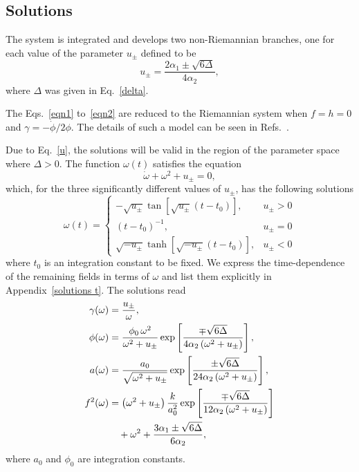 \documentclass[aps,prd,12pt,superscriptaddress,showpacs,showkeys,longbibliography,reprint,nofootinbib]{revtex4-1}
\begin{document}
\subsection{Solutions}

The system is integrated and develops two non-Riemannian branches, one for each value of the parameter $u_\pm$ defined to be
\begin{equation}
  \label{u}
  u_\pm=\frac{2\alpha_1\pm\sqrt{6\Delta}}{4\alpha_2},
\end{equation}
where $\Delta$ was given in Eq.~\eqref{delta}.

The Eqs.~\eqref{eqn1} to~\eqref{eqn2} are reduced to the Riemannian system when \mbox{$f=h=0$} and \mbox{$\gamma=-\dot{\phi}/2\phi$}. The details of such a model can be seen in Refs.~\cite{Deruelle:1986iv,Deruelle:2003ck,Henriques:1986jw,*Ishihara:1986if,Kleidis:1997mu}.

Due to Eq.~\eqref{u}, the solutions will be valid in the region of the parameter space where $\Delta>0$. The function $\omega(t)$ satisfies the equation
\begin{equation}
  \dot{\omega}+\omega^2+u_{\pm} = 0,
\end{equation}
which, for the three significantly different values of $u_\pm$, has the following solutions
\begin{equation}
  \omega(t) =
  \begin{cases}
    -\sqrt{u_\pm}\tan\left[\sqrt{u_\pm}\left(t-t_0\right)\right], & u_\pm > 0 \\
    \left(t-t_0\right)^{-1}, & u_\pm = 0 \\
    \sqrt{-u_\pm}\tanh\left[\sqrt{-u_\pm}\left(t-t_0\right)\right], & u_\pm < 0
  \end{cases}
\end{equation}
where $t_0$ is an integration constant to be fixed. We express the time-dependence of the remaining fields in terms of $\omega$ and list them explicitly in Appendix~\ref{solutions t}. The solutions read
\begin{align}
  \gamma(\omega)&=\frac{u_\pm}{\omega},\\
  \phi(\omega)&=\frac{\phi_0\,\omega^2}{\omega^2+u_\pm}\exp\left[\frac{\mp\sqrt{6\Delta}}{4\alpha_2\left(\omega^2+u_\pm\right)}\right],\\
  a(\omega)&=\frac{a_0}{\sqrt{\omega^2+u_\pm}}\exp\left[\frac{\pm\sqrt{6\Delta}} {24\alpha_2\left(\omega^2+u_\pm\right)}\right],\\
  f^2(\omega)&=\left(\omega^2+u_\pm\right)\frac{k}{a_0^2}\exp\left[\frac{\mp\sqrt{6\Delta}}{12\alpha_2\left(\omega^2+u_\pm\right)}\right]\notag\\
  & \quad +\omega^2  + \frac{3\alpha_1\pm\sqrt{6\Delta}}{6\alpha_2},
\end{align}
where $a_0$ and $\phi_0$ are integration constants. 
\end{document}
